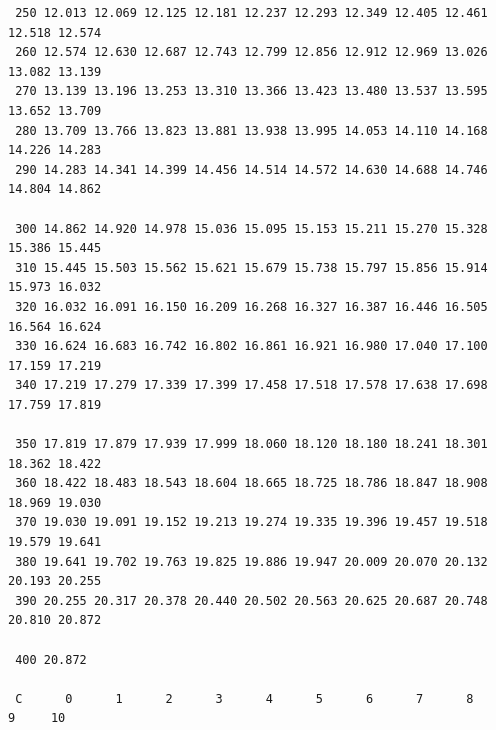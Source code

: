 \documentclass[paper=a4, fontsize=11pt, abstract=on]{scrartcl}
\numberwithin{equation}{section}		%
\numberwithin{figure}{section}			%
\numberwithin{table}{section}				%
\begin{document}
\begin{lstlisting}
 250 12.013 12.069 12.125 12.181 12.237 12.293 12.349 12.405 12.461 12.518 12.574  
 260 12.574 12.630 12.687 12.743 12.799 12.856 12.912 12.969 13.026 13.082 13.139  
 270 13.139 13.196 13.253 13.310 13.366 13.423 13.480 13.537 13.595 13.652 13.709  
 280 13.709 13.766 13.823 13.881 13.938 13.995 14.053 14.110 14.168 14.226 14.283  
 290 14.283 14.341 14.399 14.456 14.514 14.572 14.630 14.688 14.746 14.804 14.862  
 
 300 14.862 14.920 14.978 15.036 15.095 15.153 15.211 15.270 15.328 15.386 15.445  
 310 15.445 15.503 15.562 15.621 15.679 15.738 15.797 15.856 15.914 15.973 16.032  
 320 16.032 16.091 16.150 16.209 16.268 16.327 16.387 16.446 16.505 16.564 16.624  
 330 16.624 16.683 16.742 16.802 16.861 16.921 16.980 17.040 17.100 17.159 17.219  
 340 17.219 17.279 17.339 17.399 17.458 17.518 17.578 17.638 17.698 17.759 17.819  
 
 350 17.819 17.879 17.939 17.999 18.060 18.120 18.180 18.241 18.301 18.362 18.422  
 360 18.422 18.483 18.543 18.604 18.665 18.725 18.786 18.847 18.908 18.969 19.030  
 370 19.030 19.091 19.152 19.213 19.274 19.335 19.396 19.457 19.518 19.579 19.641  
 380 19.641 19.702 19.763 19.825 19.886 19.947 20.009 20.070 20.132 20.193 20.255  
 390 20.255 20.317 20.378 20.440 20.502 20.563 20.625 20.687 20.748 20.810 20.872  
 
 400 20.872
 
 C      0      1      2      3      4      5      6      7      8      9     10 
\end{lstlisting}
\subsection{}







\end{document}
